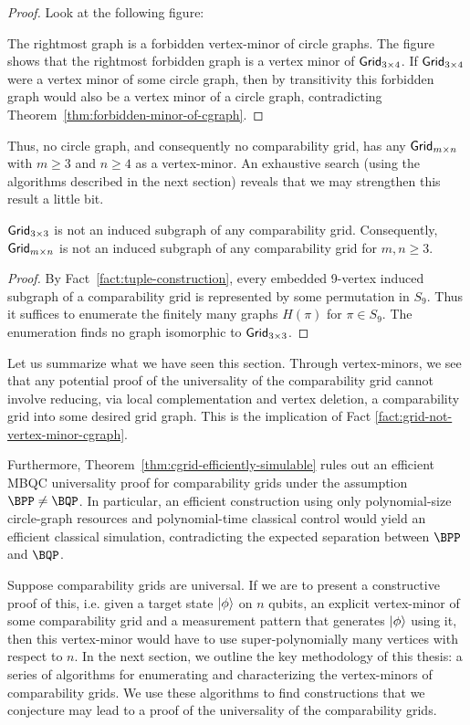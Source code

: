 \begin{proof}
Look at the following figure:

The rightmost graph is a forbidden vertex-minor of circle graphs. The figure shows that the rightmost forbidden graph is a vertex minor of
\(\mathsf{Grid}_{3\times4}\). If \(\mathsf{Grid}_{3\times4}\) were a vertex minor of some
circle graph, then by transitivity this forbidden graph would also be a vertex
minor of a circle graph, contradicting Theorem~\ref{thm:forbidden-minor-of-cgraph}. 
\end{proof}

Thus, no circle graph, and consequently no comparability grid, has any $\mathsf{Grid}_{m \times n}$ with $m \geq 3$ and $n \geq 4$ as a vertex-minor. An exhaustive search (using the algorithms described in the next section) reveals that we may strengthen this result a little bit.

\begin{fact}
\label{fact:grid-3-times-3-not-subgraph}
\(\mathsf{Grid}_{3\times3}\) is not an induced subgraph of any comparability grid.
Consequently, \(\mathsf{Grid}_{m\times n}\) is not an induced subgraph of any
comparability grid for \(m,n\ge3\).
\end{fact}

\begin{proof}
By Fact~\ref{fact:tuple-construction}, every embedded 9-vertex induced subgraph
of a comparability grid is represented by some permutation in \(S_9\). Thus it
suffices to enumerate the finitely many graphs \(H(\pi)\) for \(\pi\in S_9\).
The enumeration finds no graph isomorphic to \(\mathsf{Grid}_{3\times3}\).
\end{proof}

Let us summarize what we have seen this section. Through vertex-minors, we see that any potential proof of the universality of the comparability grid cannot involve reducing, via local complementation and vertex deletion, a comparability grid into some desired grid graph. This is the implication of Fact \ref{fact:grid-not-vertex-minor-cgraph}.

Furthermore, Theorem~\ref{thm:cgrid-efficiently-simulable} rules out an efficient
MBQC universality proof for comparability grids under the assumption
\(\BPP\neq\BQP\). In particular, an efficient construction using only polynomial-size
circle-graph resources and polynomial-time classical control would yield an efficient
classical simulation, contradicting the expected separation between \(\BPP\) and
\(\BQP\).

Suppose comparability grids are universal. If we are to present a constructive proof of this, i.e. given a target state $\ket\phi$ on $n$ qubits, an explicit vertex-minor of some comparability grid and a measurement pattern that generates $\ket\phi$ using it, then this vertex-minor would have to use super-polynomially many vertices with respect to $n$. In the next section, we outline the key methodology of this thesis: a series of algorithms for enumerating and characterizing the vertex-minors of comparability grids. We use these algorithms to find constructions that we conjecture may lead to a proof of the universality of the comparability grids.